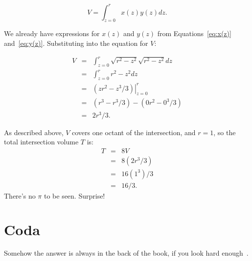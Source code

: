 \documentclass[twocolumn]{article}
\theoremstyle{definition}
\theoremstyle{plain}
\begin{document}
\begin{equation*}
  V = \int_{z=0}^r x(z) y(z) dz.
\end{equation*}

We already have expressions for $x(z)$ and $y(z)$ from
Equations~\ref{eq:x(z)} and~\ref{eq:y(z)}.  Substituting into the
equation for $V$:

\begin{eqnarray*}
  V & = & \int_{z=0}^r \sqrt{r^2 - z^2} \sqrt{r^2 - z^2} dz \\
  & = & \int_{z=0}^r r^2 - z^2 dz \\
  & = & \left. (zr^2 - z^3/3) \right|_{z=0}^r \\
  & = & (r^3 - r^3/3) - (0r^2 - 0^3/3) \\
  & = & 2r^3/3.
\end{eqnarray*}

As described above, $V$ covers one octant of the intersection, and
$r=1$, so the total intersection volume $T$ is:
\begin{eqnarray*}
  T & = & 8V \\
  & = & 8(2r^3/3) \\
  & = & 16(1^3)/3 \\
  & = & 16/3.
\end{eqnarray*}
There's no $\pi$ to be seen.  Surprise!

\section{Coda}

Somehow the answer is always in the back of the book, if you look hard
enough~\cite{Wikipedia-Steinmetz}.



\end{document}
